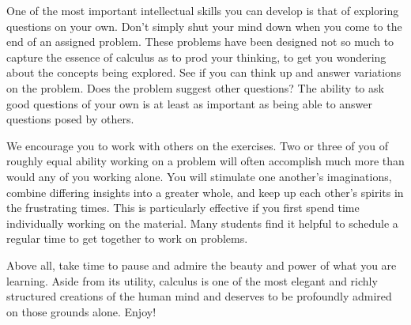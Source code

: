 One of the most important intellectual skills you can develop is that of exploring questions on your own.  Don't simply shut your mind down when you come to the end of an assigned problem.  These problems have been designed not so much to capture the essence of calculus as to prod your thinking, to get you wondering about the concepts being explored.  See if you can think up and answer variations on the problem.  Does the problem suggest other questions?  The ability to ask good questions of your own is at least as important as being able to answer questions posed by others.

We encourage you to work with others on the exercises.  Two or three of you of roughly equal ability working on a problem will often accomplish much more than would any of you working alone.  You will stimulate one another's imaginations, combine differing insights into a greater whole, and keep up each other's spirits in the frustrating times.  This is particularly effective if you first spend time individually working on the material.  Many students find it helpful to schedule a regular time to get together to work on problems.

 Above all, take time to pause and admire the beauty and power of what you are learning.  Aside from its utility, calculus is one of the most elegant and richly structured creations of the human mind and deserves to be profoundly admired on those grounds alone.  Enjoy!